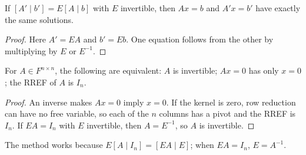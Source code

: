 \begin{theorem}
If $[A'\mid b']=E[A\mid b]$ with $E$ invertible, then $Ax=b$ and
$A'x=b'$ have exactly the same solutions.
\end{theorem}
\begin{proof}
Here $A'=EA$ and $b'=Eb$. One equation follows from the other by
multiplying by $E$ or $E^{-1}$.
\end{proof}

\begin{theorem}
For $A\in F^{n\times n}$, the following are equivalent:
$A$ is invertible; $Ax=0$ has only $x=0$; the RREF of $A$ is $I_n$.
\end{theorem}
\begin{proof}
An inverse makes $Ax=0$ imply $x=0$. If the kernel is zero, row reduction
can have no free variable, so each of the $n$ columns has a pivot and the
RREF is $I_n$. If $EA=I_n$ with $E$ invertible, then $A=E^{-1}$, so $A$
is invertible.
\end{proof}

The method works because $E[A\mid I_n]=[EA\mid E]$; when $EA=I_n$,
$E=A^{-1}$.

